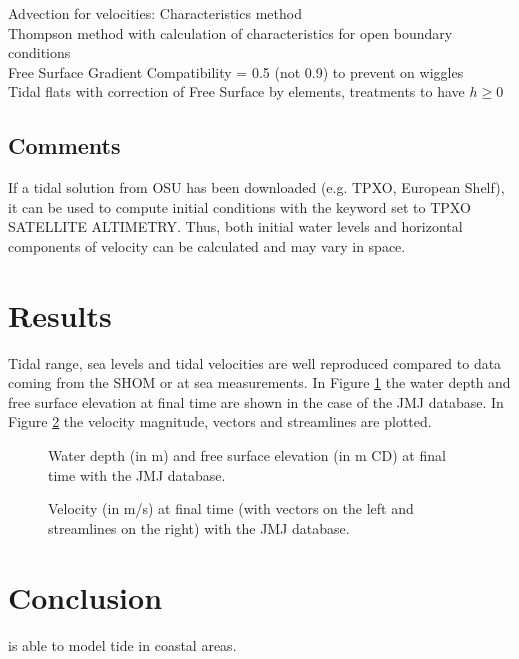 Advection for velocities: Characteristics method\\
Thompson method with calculation of characteristics for open boundary
conditions\\
Free Surface Gradient Compatibility = 0.5 (not 0.9) to prevent on
wiggles\\
Tidal flats with correction of Free Surface by elements, treatments
to have $h \ge 0$

\subsection{Comments}

If a tidal solution from OSU has been downloaded (e.g. TPXO, European
Shelf), it can be used to compute initial conditions with the keyword
 set to TPXO SATELLITE ALTIMETRY.
Thus, both initial water levels and horizontal components of velocity
can be calculated and may vary in space.

\section{Results}

Tidal range, sea levels and tidal velocities are well reproduced compared to
data coming from the SHOM or at sea measurements. In Figure \ref{fig:tide:H} the water depth
and free surface elevation at final time are shown in the case of the JMJ database.
In Figure \ref{fig:tide:U} the velocity magnitude, vectors and streamlines are plotted.

\begin{figure}[!htbp]
\begin{minipage}[t]{0.5\textwidth}
 \centering
\end{minipage}
\begin{minipage}[t]{0.5\textwidth}
 \centering
\end{minipage}
\caption{Water depth (in m) and free surface elevation (in m CD) at final time with the JMJ database.}
\label{fig:tide:H}
\end{figure}

\begin{figure}[H]
\begin{minipage}[t]{0.5\textwidth}
 \centering
\end{minipage}
\begin{minipage}[t]{0.5\textwidth}
 \centering
\end{minipage}
\caption{Velocity (in m/s) at final time (with vectors on the left and streamlines on the right) with the JMJ database.}
\label{fig:tide:U}
\end{figure}


\section{Conclusion}

 is able to model tide in coastal areas.

